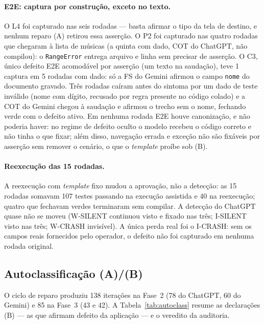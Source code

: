 \documentclass[12pt]{article}
\begin{document}
\paragraph{E2E: captura por construção, exceto no texto.} O L4 foi capturado
nas seis rodadas --- basta afirmar o tipo da tela de destino, e nenhum reparo
(A) retirou essa asserção. O P2 foi capturado nas quatro rodadas que
chegaram à lista de músicas (a quinta com dado, COT do ChatGPT, não compilou): o \texttt{RangeError} entrega arquivo e linha
sem precisar de asserção. O C3, único defeito E2E acomodável por asserção
(um texto na saudação), teve 1 captura em 5 rodadas com dado: só a FS do
Gemini afirmou o campo \texttt{nome} do documento gravado. Três rodadas
caíram antes do sintoma por um dado de teste inválido (nome com dígito,
recusado por regra presente no código colado) e a COT do Gemini chegou à
saudação e afirmou o trecho sem o nome, fechando verde com o defeito ativo.
Em nenhuma rodada E2E houve canonização, e não poderia haver: no regime de
defeito oculto o modelo recebeu o código correto e não tinha o que fixar;
além disso, navegação errada e exceção não são fixáveis por asserção sem
remover o cenário, o que o \textit{template} proíbe sob (B).

\paragraph{Reexecução das 15 rodadas.} A reexecução com \textit{template}
fixo mudou a aprovação, não a detecção: as 15 rodadas somavam 107 testes
passando na execução assistida e 40 na reexecução; quatro que fechavam
verdes terminaram sem compilar. A detecção do ChatGPT quase não se moveu
(W-SILENT continuou visto e fixado nas três; I-SILENT visto nas três;
W-CRASH invisível). A única perda real foi o I-CRASH: sem os campos reais
fornecidos pelo operador, o defeito não foi capturado em nenhuma rodada
original.

\subsection{Autoclassificação (A)/(B)}
\label{subsec:res-autoclass}

O ciclo de reparo produziu 138 iterações na Fase~2 (78 do ChatGPT, 60 do
Gemini) e 85 na Fase~3 (43 e 42). A Tabela~\ref{tab:autoclass} resume as declarações (B) --- as
que afirmam defeito da aplicação --- e o veredito da auditoria.
\end{document}
